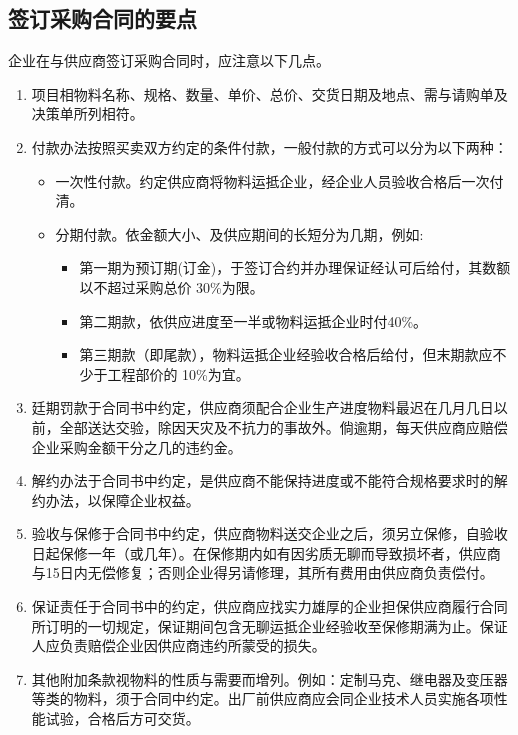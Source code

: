 \subsection {签订采购合同的要点}

    企业在与供应商签订采购合同时，应注意以下几点。

    \begin{enumerate}

        \item 项目相物料名称、规格、数量、单价、总价、交货日期及地点、需与请购单及决策单所列相符。

        \item 付款办法按照买卖双方约定的条件付款，一般付款的方式可以分为以下两种：
            \begin{itemize}
                \item  一次性付款。约定供应商将物料运抵企业，经企业人员验收合格后一次付清。
                \item  分期付款。依金额大小、及供应期间的长短分为几期，例如:
                    \begin{itemize}
                        \item  第一期为预订期(订金)，于签订合约并办理保证经认可后给付，其数额以不超过采购总价 30\%为限。
                        \item 第二期款，依供应进度至一半或物料运抵企业时付40\%。
                        \item 第三期款（即尾款），物料运抵企业经验收合格后给付，但末期款应不少于工程部价的 10\%为宜。
                \end{itemize}
            \end{itemize}
        \item 廷期罚款于合同书中约定，供应商须配合企业生产进度物料最迟在几月几日以前，全部送达交验，除因天灾及不抗力的事故外。倘逾期，每天供应商应赔偿企业采购金额干分之几的违约金。

        \item 解约办法于合同书中约定，是供应商不能保持进度或不能符合规格要求时的解约办法，以保障企业权益。

        \item 验收与保修于合同书中约定，供应商物料送交企业之后，须另立保修，自验收日起保修一年（或几年）。在保修期内如有因劣质无聊而导致损坏者，供应商与15日内无偿修复；否则企业得另请修理，其所有费用由供应商负责偿付。

        \item 保证责任于合同书中的约定，供应商应找实力雄厚的企业担保供应商履行合同所订明的一切规定，保证期间包含无聊运抵企业经验收至保修期满为止。保证人应负责赔偿企业因供应商违约所蒙受的损失。

        \item 其他附加条款视物料的性质与需要而增列。例如：定制马克、继电器及变压器等类的物料，须于合同中约定。出厂前供应商应会同企业技术人员实施各项性能试验，合格后方可交货。
    \end{enumerate}
